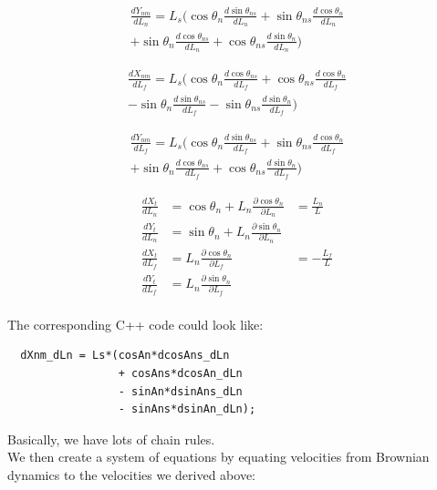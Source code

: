 \documentclass[11pt,twocolumn]{article}
\begin{document}
\begin{multline}
  \frac{dY_{nm}}{dL_n} = L_s\Big(
  \cos\theta_n\frac{d\sin\theta_{ns}}{dL_n}
  + \sin\theta_{ns}\frac{d\cos\theta_{n}}{dL_n} \\
  + \sin\theta_n\frac{d\cos\theta_{ns}}{dL_n}
  + \cos\theta_{ns}\frac{d\sin\theta_{n}}{dL_n}
  \Big)
\end{multline}

\begin{multline}
  \frac{dX_{nm}}{dL_f} = L_s\Big(
  \cos\theta_n\frac{d\cos\theta_{ns}}{dL_f}
  + \cos\theta_{ns}\frac{d\cos\theta_{n}}{dL_f} \\
  - \sin\theta_n\frac{d\sin\theta_{ns}}{dL_f}
  - \sin\theta_{ns}\frac{d\sin\theta_{n}}{dL_f}
  \Big)
\end{multline}

\begin{multline}
  \frac{dY_{nm}}{dL_f} = L_s\Big(
  \cos\theta_n\frac{d\sin\theta_{ns}}{dL_f}
  + \sin\theta_{ns}\frac{d\cos\theta_{n}}{dL_f} \\
  + \sin\theta_n\frac{d\cos\theta_{ns}}{dL_f}
  + \cos\theta_{ns}\frac{d\sin\theta_{n}}{dL_f}
  \Big)
\end{multline}

\begin{align}
  \frac{dX_{t}}{dL_n} &= \cos\theta_n + L_n\frac{\partial \cos\theta_n}{\partial L_n} &= \frac{L_n}{L}\\
  \frac{dY_{t}}{dL_n} &= \sin\theta_n + L_n\frac{\partial \sin\theta_n}{\partial L_n}\\
  \frac{dX_{t}}{dL_f} &= L_n\frac{\partial \cos\theta_n}{\partial L_f} &= -\frac{L_f}{L}\\
  \frac{dY_{t}}{dL_f} &= L_n\frac{\partial \sin\theta_n}{\partial L_f}\\
\end{align}

The corresponding C++ code could look like:
\begin{verbatim}
  dXnm_dLn = Ls*(cosAn*dcosAns_dLn
                 + cosAns*dcosAn_dLn
                 - sinAn*dsinAns_dLn
                 - sinAns*dsinAn_dLn);
\end{verbatim}
Basically, we have lots of chain rules.\\

We then create a system of equations by equating velocities from Brownian dynamics to the velocities
we derived above:

\onecolumn
\end{document}
